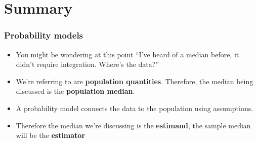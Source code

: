 \documentclass[aspectratio=169]{beamer}
\begin{document}
\section{Summary}
\begin{frame}
\frametitle{Probability models}
\begin{itemize}
\item You might be wondering at this point ``I've heard of a median before, it didn't require integration. Where's the data?''
\item We're referring to are {\bf population quantities}. Therefore, the median being
	discussed is the {\bf population median}.
\item A probability model connects the data to the population using assumptions.
\item Therefore the median we're discussing is the {\bf estimand}, the sample median will be the {\bf estimator}
\end{itemize}
\end{frame}
\end{document}
